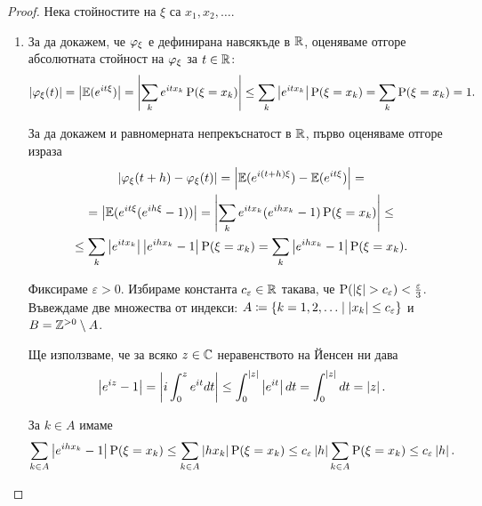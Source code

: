 \documentclass[numbers=endperiod, DIV=15, bibliography=totocnumbered]{scrartcl}
\begin{document}
\begin{proof}
  Нека стойностите на $\xi$ са $x_1, x_2, \ldots$.

  \begin{enumerate}
    \item За да докажем, че $\varphi_\xi$ е дефинирана навсякъде в $\mathbb{R}$, оценяваме отгоре абсолютната стойност на $\varphi_\xi$ за $t \in \mathbb{R}$:
    \begin{displaymath}
      \left\vert \varphi_\xi(t) \right\vert
      =
      \left\vert \mathbb{E}(e^{it\xi}) \right\vert
      =
      \left\vert \sum_k e^{it x_k} \operatorname{P}(\xi = x_k) \right\vert
      \leq
      \sum_k \left\vert e^{it x_k} \right\vert \operatorname{P}(\xi = x_k)
      =
      \sum_k \operatorname{P}(\xi = x_k)
      =
      1.
    \end{displaymath}

    За да докажем и равномерната непрекъснатост в $\mathbb{R}$, първо оценяваме отгоре израза
    \begin{multline*}
      \left\vert \varphi_\xi(t + h) - \varphi_\xi(t) \right\vert
      =
      \left\vert \mathbb{E}(e^{i(t + h)\xi}) - \mathbb{E}(e^{it\xi}) \right\vert
      = \\ =
      \left\vert \mathbb{E}(e^{it\xi} (e^{ih\xi} - 1)) \right\vert
      =
      \left\vert \sum_k e^{it x_k} (e^{ih x_k} - 1) \operatorname{P}(\xi = x_k) \right\vert
      \leq \\ \leq
      \sum_k \left\vert e^{it x_k} \right\vert \left\vert e^{ih x_k} - 1 \right\vert \operatorname{P}(\xi = x_k)
      =
      \sum_k \left\vert e^{ih x_k} - 1 \right\vert \operatorname{P}(\xi = x_k).
    \end{multline*}

    Фиксираме $\varepsilon > 0$. Избираме константа $c_\varepsilon \in \mathbb{R}$ такава, че $\operatorname{P}(\left\vert \xi \right\vert > c_\varepsilon) < \frac \varepsilon 3$.
    Въвеждаме две множества от индекси: $A \coloneqq \{ k = 1, 2, \ldots \mid \left\vert x_k \right\vert \leq c_\varepsilon \}$ и $B = \mathbb{Z}^{> 0} \setminus A$.

    Ще използваме, че за всяко $z \in \mathbb{C}$ неравенството на Йенсен ни дава
    \begin{displaymath}
      \left\vert e^{iz} - 1 \right\vert
      =
      \left\vert i \int_0^z e^{it} dt \right\vert
      \leq
      \int_0^{\left\vert z \right\vert} \left\vert e^{it} \right\vert dt
      =
      \int_0^{\left\vert z \right\vert} dt
      =
      \left\vert z \right\vert.
    \end{displaymath}

    За $k \in A$ имаме
    \begin{displaymath}
      \sum_{k \in A} \left\vert e^{ih x_k} - 1 \right\vert \operatorname{P}(\xi = x_k)
      \leq
      \sum_{k \in A} \left\vert h x_k \right\vert \operatorname{P}(\xi = x_k)
      \leq
      c_\varepsilon \left\vert h \right\vert \sum_{k \in A} \operatorname{P}(\xi = x_k)
      \leq
      c_\varepsilon \left\vert h \right\vert.
    \end{displaymath}


\end{enumerate}
\end{proof}
\end{document}
